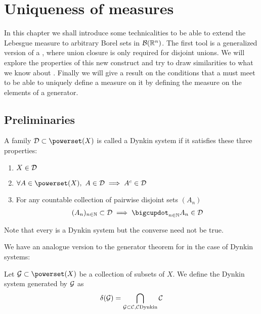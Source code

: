 
\chapter{Uniqueness of measures}

In this chapter we shall introduce some technicalities to be able to extend the Lebesgue measure to arbitrary Borel sets in $\mathcal{B}(\mathbb{R}^n)$. The first tool is a generalized version of a \siga, where union closure is only required for disjoint unions. We will explore the properties of this new construct and try to draw similarities to what we know about \sigas. Finally we will give a result on the conditions that a \siga must meet to be able to uniquely define a measure on it by defining the measure on the elements of a generator.

\section{Preliminaries}


\begin{dfn}
	A family $\calD \subset \powerset(X)$ is called a Dynkin system if it satisfies these three properties:
	\begin{enumerate}
		\item $X \in \mathcal{D}$
		\item $\forall A \in \powerset(X),\ A \in \calD \implies A^\complement \in \calD$
		\item For any countable collection of pairwise disjoint sets $(A_n)$
		\begin{align*}
			(A_n)_{n\in\N} \subset \calD \implies \bigcupdot_{n \in \N} A_n \in \calD
		\end{align*}
	\end{enumerate}
\end{dfn}

Note that every \siga is a Dynkin system but the converse need not be true.

We have an analogue version to the generator theorem for \sigas in the case of Dynkin systems:

\begin{dfn}
	Let $\calG \subset \powerset(X)$ be a collection of subsets of $X$. We define the Dynkin system generated by $\mathcal{G}$ as
	\begin{align*}
		\delta(\mathcal{G}) = \bigcap_{\mathcal{G} \subset \mathcal{C}, \mathcal{C} \text{Dynkin}} \mathcal{C}
	\end{align*}
\end{dfn}

